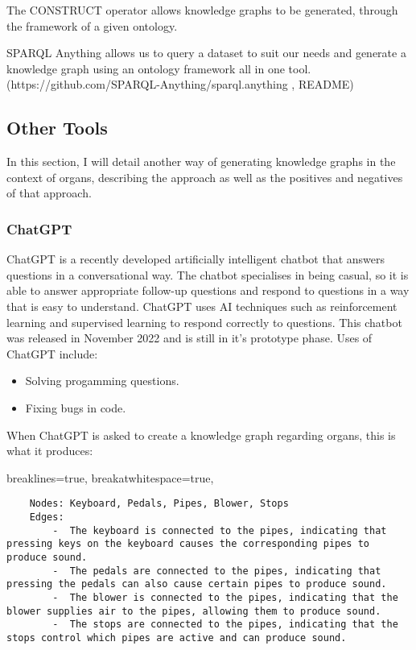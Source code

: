 The CONSTRUCT operator allows knowledge graphs to be generated, through the framework of a given ontology.

SPARQL Anything allows us to query a dataset to suit our needs and generate a knowledge graph using an ontology framework all in one tool. 
(https://github.com/SPARQL-Anything/sparql.anything , README)

\subsection{Other Tools}

\hspace{0.5cm} In this section, I will detail another way of generating knowledge graphs in the context of organs, describing  the approach as well as the positives and negatives of that approach.

\subsubsection{ChatGPT}
\hspace{0.5cm} ChatGPT is a recently developed artificially intelligent chatbot that answers questions in a conversational way. The chatbot specialises in being casual, so it is able to answer appropriate follow-up questions and respond to questions in a way that is easy to understand. ChatGPT uses AI techniques such as reinforcement learning and supervised learning to respond correctly to questions. This chatbot was released in November 2022 and is still in it's prototype phase. Uses of ChatGPT include:
\begin{itemize}
\item Solving progamming questions.
\item Fixing bugs in code.
\end{itemize}

When ChatGPT is asked to create a knowledge graph regarding organs, this is what it produces:

\lstset
{
    breaklines=true,
    breakatwhitespace=true,
}
\begin{lstlisting}
    Nodes: Keyboard, Pedals, Pipes, Blower, Stops
    Edges:
        -  The keyboard is connected to the pipes, indicating that pressing keys on the keyboard causes the corresponding pipes to produce sound.
        -  The pedals are connected to the pipes, indicating that pressing the pedals can also cause certain pipes to produce sound.
        -  The blower is connected to the pipes, indicating that the blower supplies air to the pipes, allowing them to produce sound.
        -  The stops are connected to the pipes, indicating that the stops control which pipes are active and can produce sound.
\end{lstlisting}

